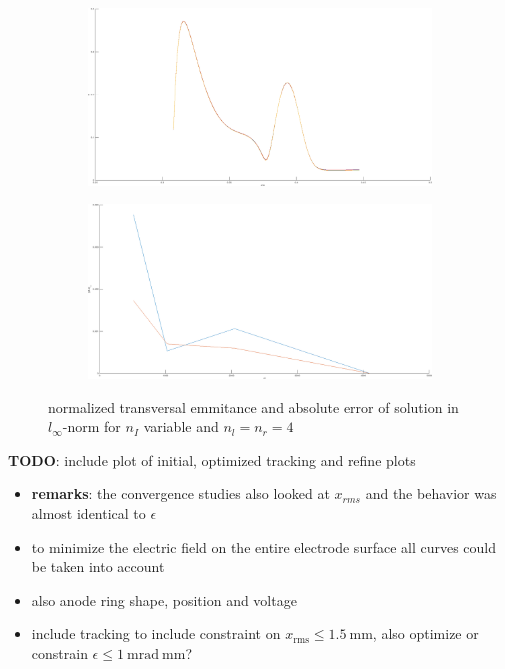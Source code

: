 \begin{center}
\begin{figure}[H]
   \begin{subfigure}{0.45\textwidth}
      \includegraphics[width=\textwidth]{fig/sc_emit_I}
   \end{subfigure}
   \begin{subfigure}{0.45\textwidth}
      \includegraphics[width=\textwidth]{fig/sc_cvg_I}
   \end{subfigure}
   \caption{normalized transversal emmitance and absolute error of solution in $l_\infty$-norm for $n_I$ variable and $n_l=n_r=4$}
   \label{fig:sc_cvg_I}
\end{figure}
\end{center}

\textbf{TODO}: include plot of initial, optimized tracking and refine plots

\begin{itemize}
   \item \textbf{remarks}: the convergence studies also looked at $x_{rms}$ and the behavior was almost identical to $\epsilon$

   \item to minimize the electric field on the entire electrode surface all curves could be taken into account
   \item also anode ring shape, position and voltage
   \item include tracking to include constraint on $x_\mathrm{rms} \leq 1.5\ \mathrm{mm}$, also optimize or constrain $\epsilon \leq 1\ \mathrm{mrad\ mm}$?
\end{itemize}
